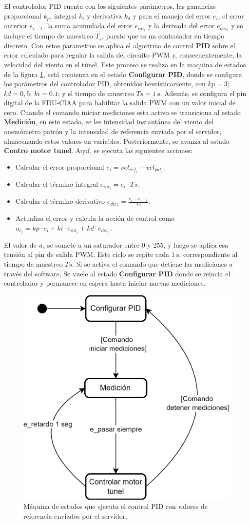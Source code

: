 El controlador PID cuenta con los siguientes parámetros, las ganancias proporcional $k_{p}$, integral $k_{i}$ y derivativa $k_{d}$ y para el manejo del error $e_{i}$, el error anterior $e_{i-1}$, la suma acumulada del error $e_{int_{i}}$ y la derivada del error $e_{dev_{i}}$ y se incluye el tiempo de muestreo $T_{s}$, puesto que es un controlador en tiempo discreto. Con estos parametros se aplica el algoritmo de control \textbf{PID} sobre el error calculado para regular la salida del circuito PWM y, consecuentemente, la velocidad del viento en el túnel. Este proceso se realiza en la maquina de estados de la figura \ref{fig:sc_controlTunnel}, está comienza en el estado \textbf{Configurar PID}, donde se configura los parámetros del controlador PID, obtenidos heurísticamente, con $kp = 3$; $kd = 0,5$; $ki = 0.1$; y el tiempo de muestreo $Ts = \SI{1}{\second}$. Además, se configura el pin digital de la EDU-CIAA para habilitar la salida PWM con un valor inicial de cero. Cuando el comando iniciar mediciones esta activo se transiciona al estado \textbf{Medición}, en este estado, se lee  intensidad instantánea del viento del anemómetro patrón y la intensidad de referencia enviada por el servidor, almacenando estos valores en variables. Posteriormente, se avanza al estado \textbf{Contro motor tunel}. Aquí, se ejecuta las siguientes acciones:
\begin{itemize}
    \item Calcular el error proporcional $e_{i} = vel_{ref_{i}} - vel_{pat_{i}}$.
    \item Calcular el término integral $e_{int_{i}} = e_{i} \cdot Ts$.
    \item Calcular el término derivativo $e_{dev_{i}} = \frac{e_{i} - e_{i-1}}{Ts}$.
    \item Actualiza el error y calcula la acción de control como $u_{c_{i}} = kp \cdot e_{i} + ki \cdot e_{int_{i}} + kd \cdot e_{dev_{i}}$.
\end{itemize}
El valor de $u_{c}$ se somete a un saturador entre 0 y 255, y luego se aplica esa tensión al pin de salida PWM. Este ciclo se repite cada $\SI{1}{\second}$, correspondiente al tiempo de muestreo $Ts$. Si se activa el comando que detiene las mediciones a través del software, Se vuele al estado \textbf{Configurar PID} donde se reincia el controlador y permanece en espera hasta iniciar nuevas mediciones.

\begin{figure}[H]
    \centering
    \includegraphics[width=0.6\linewidth]{Figuras/datalogger/Firmware/sc_controlTunnel.png}
    \caption{Máquina de estados que ejecuta el control PID con valores de referencia enviados por el servidor.}
    \label{fig:sc_controlTunnel}
\end{figure}
